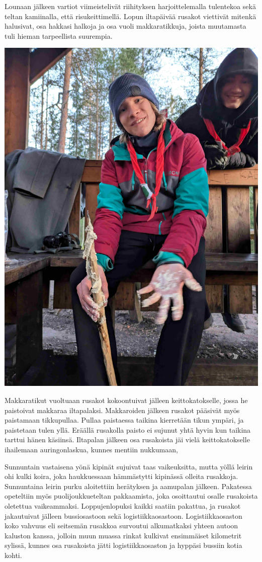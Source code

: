 \begin{multicols}{2}
Lounaan jälkeen vartiot viimeistelivät riihityksen harjoittelemalla tulentekoa
sekä teltan kamiinalla, että risukeittimellä. Lopun iltapäivää rusakot
viettivät mitenkä halusivat, osa hakkasi halkoja ja osa vuoli makkaratikkuja,
joista muutamasta tuli hieman tarpeellista suurempia. 

\smallskip
\noindent\includegraphics[width=1.0\linewidth]{assets/telttaretki3}

\bigskip

Makkaratikut vuoltuaan rusakot kokoontuivat jälleen keittokatokselle, jossa he
paistoivat makkaraa iltapalaksi. Makkaroiden jälkeen rusakot pääsivät myös
paistamaan tikkupullaa. Pullaa paistaessa taikina kierretään tikun ympäri, ja
paistetaan tulen yllä. Eräällä rusakolla paisto ei sujunut yhtä hyvin kun
taikina tarttui hänen käsiinsä. Iltapalan jälkeen osa rusakoista jäi vielä
keittokatokselle ihailemaan auringonlaskua, kunnes mentiin nukkumaan,

Sunnuntain vastaisena yönä kipinät sujuivat taas vaikeuksitta, mutta yöllä
leirin ohi kulki koira, joka haukkuessaan hämmästytti kipinässä olleita
rusakkoja. Sunnuntaina leirin purku aloitettiin herätyksen ja aamupalan
jälkeen. Pakatessa opeteltiin myös puolijoukkueteltan pakkaamista, joka
osoittautui osalle rusakoista oletettua vaikeammaksi. Loppujenlopuksi kaikki
saatiin pakattua, ja rusakot jakautuivat jälleen bussiosastoon sekä
logistiikkaosastoon. Logistiikkaosaston koko vahvuus eli seitsemän rusakkoa
survoutui alkumatkaksi yhteen autoon kaluston kanssa, jolloin muun muassa
rinkat kulkivat ensimmäiset kilometrit sylissä, kunnes osa rusakoista jätti
logistiikkaosaston ja hyppäsi bussiin kotia kohti.


\end{multicols}
